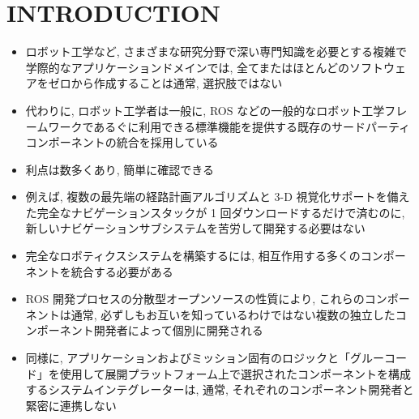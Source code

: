
\section{INTRODUCTION}
\label{sec: introduction}

\begin{frame}{}
    \begin{itemize}
        \item ロボット工学など, さまざまな研究分野で深い専門知識を必要とする複雑で学際的なアプリケーションドメインでは, 全てまたはほとんどのソフトウェアをゼロから作成することは通常, 選択肢ではない
        \item 代わりに, ロボット工学者は一般に, ROS などの一般的なロボット工学フレームワークであるぐに利用できる標準機能を提供する既存のサードパーティコンポーネントの統合を採用している
        \item 利点は数多くあり, 簡単に確認できる
        \item 例えば, 複数の最先端の経路計画アルゴリズムと 3-D 視覚化サポートを備えた完全なナビゲーションスタックが 1 回ダウンロードするだけで済むのに, 新しいナビゲーションサブシステムを苦労して開発する必要はない
    \end{itemize}
\end{frame}

\begin{frame}{}
    \begin{itemize}
        \item 完全なロボティクスシステムを構築するには, 相互作用する多くのコンポーネントを統合する必要がある
        \item ROS 開発プロセスの分散型オープンソースの性質により, これらのコンポーネントは通常, 必ずしもお互いを知っているわけではない複数の独立したコンポーネント開発者によって個別に開発される
        \item 同様に, アプリケーションおよびミッション固有のロジックと「グルーコード」を使用して展開プラットフォーム上で選択されたコンポーネントを構成するシステムインテグレーターは, 通常, それぞれのコンポーネント開発者と緊密に連携しない
    \end{itemize}
\end{frame}

